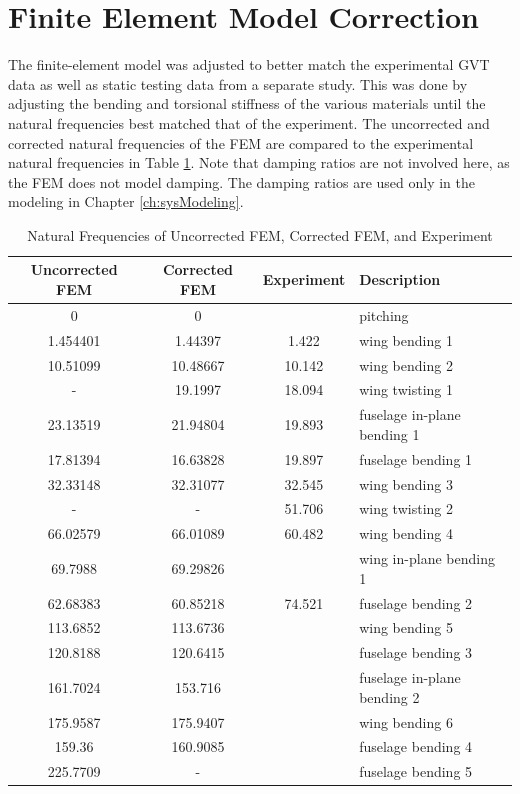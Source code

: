 \section{Finite Element Model Correction} %

The finite-element model was adjusted to better match the experimental GVT data as well as static testing data from a separate study. This was done by adjusting the bending and torsional stiffness of the various materials until the natural frequencies best matched that of the experiment. The uncorrected and corrected natural frequencies of the FEM are compared to the experimental natural frequencies in Table \ref{tab:gvtCompare}. Note that damping ratios are not involved here, as the FEM does not model damping. The damping ratios are used only in the modeling in Chapter \ref{ch:sysModeling}.

\begin{table}[H]
	\centering
	\label{tab:gvtCompare}
	\caption{Natural Frequencies of Uncorrected FEM, Corrected FEM, and Experiment}
	\begin{tabular}{cccl}
		\hline\hline
		Uncorrected FEM & Corrected FEM & Experiment & Description \\
		\hline
        0 & 0 &  & pitching \\
		1.454401 & 1.44397 & 1.422 & wing bending 1 \\
        10.51099 & 10.48667 & 10.142 & wing bending 2 \\
        - & 19.1997 & 18.094 & wing twisting 1 \\
        23.13519 & 21.94804 & 19.893 & fuselage in-plane bending 1 \\
        17.81394 & 16.63828 & 19.897 & fuselage bending 1 \\
        32.33148 & 32.31077 & 32.545 & wing bending 3 \\
        - & - & 51.706 & wing twisting 2 \\
        66.02579 & 66.01089 & 60.482 & wing bending 4 \\
        69.7988 & 69.29826 & & wing in-plane bending 1 \\
        62.68383 & 60.85218 & 74.521 & fuselage bending 2 \\
        113.6852 & 113.6736 & & wing bending 5 \\
        120.8188 & 120.6415 & & fuselage bending 3 \\
        161.7024 & 153.716 & & fuselage in-plane bending 2 \\
        175.9587 & 175.9407 & & wing bending 6 \\
        159.36 & 160.9085 & & fuselage bending 4 \\
        225.7709 & - & & fuselage bending 5 \\
		\hline\hline
	\end{tabular}
\end{table}